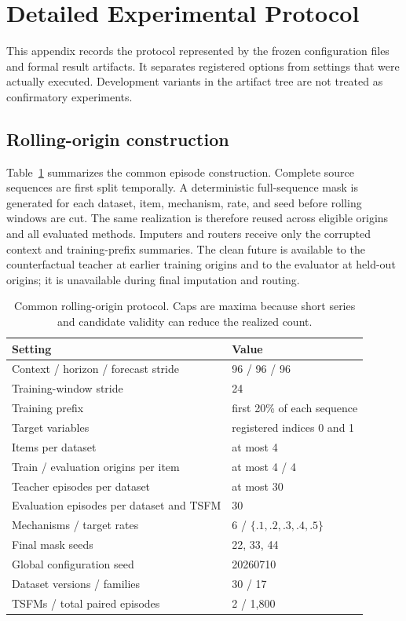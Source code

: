 \section{Detailed Experimental Protocol}
\label{app:protocol}

This appendix records the protocol represented by the frozen configuration files and formal result artifacts. It separates registered options from settings that were actually executed. Development variants in the artifact tree are not treated as confirmatory experiments.

\subsection{Rolling-origin construction}

Table~\ref{tab:protocol} summarizes the common episode construction. Complete source sequences are first split temporally. A deterministic full-sequence mask is generated for each dataset, item, mechanism, rate, and seed before rolling windows are cut. The same realization is therefore reused across eligible origins and all evaluated methods. Imputers and routers receive only the corrupted context and training-prefix summaries. The clean future is available to the counterfactual teacher at earlier training origins and to the evaluator at held-out origins; it is unavailable during final imputation and routing.

\begin{table}[h]
\centering
\small
\caption{Common rolling-origin protocol. Caps are maxima because short series and candidate validity can reduce the realized count.}
\label{tab:protocol}
\begin{tabular}{ll}
\toprule
Setting & Value \\
\midrule
Context / horizon / forecast stride & 96 / 96 / 96 \\
Training-window stride & 24 \\
Training prefix & first 20\% of each sequence \\
Target variables & registered indices 0 and 1 \\
Items per dataset & at most 4 \\
Train / evaluation origins per item & at most 4 / 4 \\
Teacher episodes per dataset & at most 30 \\
Evaluation episodes per dataset and TSFM & 30 \\
Mechanisms / target rates & 6 / $\{.1,.2,.3,.4,.5\}$ \\
Final mask seeds & 22, 33, 44 \\
Global configuration seed & 20260710 \\
Dataset versions / families & 30 / 17 \\
TSFMs / total paired episodes & 2 / 1,800 \\
\bottomrule
\end{tabular}
\end{table}

